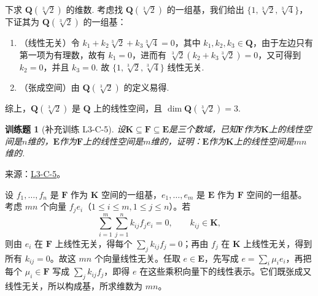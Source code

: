 \documentclass[12pt,fontset=fandol]{ctexart}
\newtheorem{exercise}{训练题}[section]
\begin{document}
\begin{solve}
            下求 $\mathbf{Q}(\sqrt[3]{2})$ 的维数. 考虑找 $\mathbf{Q}(\sqrt[3]{2})$ 的一组基，我们给出 $\{1, \sqrt[3]{2}, \sqrt[3]{4}\}$，下证其为 $\mathbf{Q}(\sqrt[3]{2})$ 的一组基：

            \begin{enumerate}
                \item （线性无关）令 $k_1 + k_2 \sqrt[3]{2} + k_3 \sqrt[3]{4} = 0$，其中 $k_1, k_2, k_3 \in \mathbf{Q}$，由于左边只有第一项为有理数，故有 $k_1 = 0$，进而有 $\sqrt[3]{2} (k_2 + k_3 \sqrt[3]{2}) = 0$，又可得到 $k_2 = 0$，并且 $k_3 = 0$. 故 $\{1, \sqrt[3]{2}, \sqrt[3]{4}\}$ 线性无关.

                \item （张成空间）由 $\mathbf{Q}(\sqrt[3]{2})$ 的定义易得.
            \end{enumerate}
            综上，$\mathbf{Q}(\sqrt[3]{2})$ 是 $\mathbf{Q}$ 上的线性空间，且 $\dim \mathbf{Q}(\sqrt[3]{2}) = 3$.
\end{solve}

\begin{exercise}[补充训练 L3-C-5]\label{prob:L3-C-5}
设$\mathbf{K} \subseteq \mathbf{F} \subseteq \mathbf{E}$是三个数域，已知$\mathbf{F}$作为$\mathbf{K}$上的线性空间是$n$维的，$\mathbf{E}$作为$\mathbf{F}$上的线性空间是$m$维的，证明：$\mathbf{E}$作为$\mathbf{K}$上的线性空间是$mn$维的.
\end{exercise}
\noindent 来源：\href{https://github.com/yhwu-is/Linear-Algebra-Left-Undone/blob/new/%E8%AE%B2%E4%B9%89/%E4%B8%93%E9%A2%98/3%20%E6%9C%89%E9%99%90%E7%BB%B4%E7%BA%BF%E6%80%A7%E7%A9%BA%E9%97%B4.tex}{L3-C-5}。
\begin{solve}
设 $f_1,\ldots,f_n$ 是 $\mathbf F$ 作为 $\mathbf K$ 空间的一组基，$e_1,\ldots,e_m$ 是 $\mathbf E$ 作为 $\mathbf F$ 空间的一组基。考虑 $mn$ 个向量 $f_je_i$（$1\le i\le m,1\le j\le n$）。若
\[\sum_{i=1}^m\sum_{j=1}^n k_{ij}f_je_i=0,\qquad k_{ij}\in\mathbf K,\]
则由 $e_i$ 在 $\mathbf F$ 上线性无关，得每个 $\sum_jk_{ij}f_j=0$；再由 $f_j$ 在 $\mathbf K$ 上线性无关，得到所有 $k_{ij}=0$。故这 $mn$ 个向量线性无关。任取 $e\in\mathbf E$，先写成 $e=\sum_i\mu_ie_i$，再把每个 $\mu_i\in\mathbf F$ 写成 $\sum_jk_{ij}f_j$，即得 $e$ 在这些乘积向量下的线性表示。它们既张成又线性无关，所以构成基，所求维数为 $mn$。
\end{solve}
\end{document}
